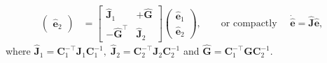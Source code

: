 \documentclass[11pt,a4paper]{article}
\begin{document}
{\begin{equation}
\begin{aligned}
\begin{pmatrix}
            \widehat{\mathbf{e}}_{2}
        \end{pmatrix} &=
        \begin{bmatrix}
            \widehat{\mathbf{J}}_1 & +\widehat{\mathbf{G}} \\
            -\widehat{\mathbf{G}}^\top & \widehat{\mathbf{J}}_2
        \end{bmatrix}
        \begin{pmatrix}
            \widehat{\mathbf{e}}_{1} \\
            \widehat{\mathbf{e}}_{2}
        \end{pmatrix}, \qquad \text{or compactly } \quad \dot{\widehat{\mathbf{e}}} = \widehat{\mathbf{J}}\widehat{\mathbf{e}},
\end{aligned}
\end{equation}
where $\widehat{\mathbf{J}}_1 = \mathbf{C}_1^{-\top} {\mathbf{J}}_1 \mathbf{C}_1^{-1}, \; \widehat{\mathbf{J}}_2 = \mathbf{C}_2^{-\top} {\mathbf{J}}_2 \mathbf{C}_2^{-1}$ and $\widehat{\mathbf{G}} = \mathbf{C}_1^{-\top} {\mathbf{G}} \mathbf{C}_2^{-1}.$
}
\end{document}
